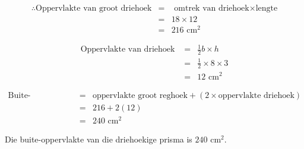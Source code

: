 \begin{wex}
{\begin{equation*}
\begin{array}{rcl}
\end{array}
\end{equation*}

\begin{equation*}
\begin{array}{rcl}
 \therefore \mbox{Oppervlakte van groot driehoek}&=& \mbox{ omtrek van driehoek}\times \mbox{lengte}\\
&=& 18 \times 12 \\
&=&216 \mbox{ cm}^2
\end{array}
\end{equation*}




\begin{equation*}
\begin{array}{rcl}
\mbox{Oppervlakte van driehoek } &= &\frac{1}{2}b \times h\\
&=&\frac{1}{2} \times 8 \times 3\\
&=&12 \mbox{ cm}^2
\end{array}
\end{equation*}




\begin{equation*}
\begin{array}{rcl}
 \mbox{Buite-oppervlakte}&=& \mbox{oppervlakte groot reghoek}  + (2\times \mbox{oppervlakte driehoek})\\
&=& 216 + 2(12) \\
&=& 240\mbox{ cm}^2
\end{array}
\end{equation*}

Die buite-oppervlakte van die driehoekige prisma is $240$ cm$^2$.

}
\end{wex}



